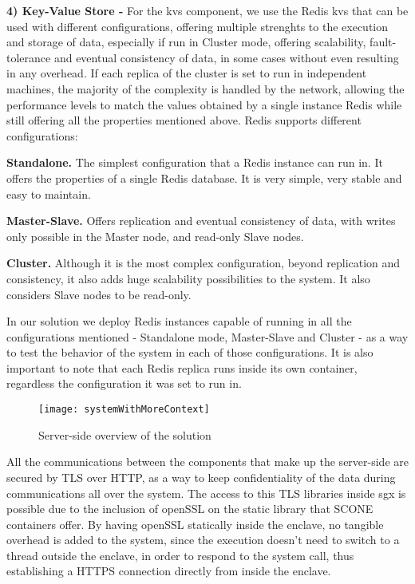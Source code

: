 \vspace{5mm} 

\textbf{4) Key-Value Store -}
For the \gls{kvs} component, we use the Redis \gls{kvs} that can be used with different configurations, offering multiple strenghts to the execution and storage of data, especially if run in Cluster mode, offering scalability, fault-tolerance and eventual consistency of data, in some cases without even resulting in any overhead. 
If each replica of the cluster is set to run in independent machines, the majority of the complexity is handled by the network, allowing the performance levels to match the values obtained by a single instance Redis while still offering all the properties mentioned above. Redis supports different configurations: 

\textbf{Standalone.} The simplest configuration that a Redis instance can run in. It offers the properties of a single Redis database. It is very simple, very stable and easy to maintain.

\textbf{Master-Slave.} Offers replication and eventual consistency of data, with writes only possible in the Master node, and read-only Slave nodes.

\textbf{Cluster.} Although it is the most complex configuration, beyond replication and consistency, it also adds huge scalability possibilities to the system. It also considers Slave nodes to be read-only.

In our solution we deploy Redis instances capable of running in all the configurations mentioned - Standalone mode, Master-Slave and Cluster - as a way to test the behavior of the system in each of those configurations. It is also important to note that each Redis replica runs inside its own container, regardless the configuration it was set to run in. 

\vspace{5mm}

\begin{figure}[htbp]
	\centering
	{\texttt{[image: systemWithMoreContext]}}
	\caption{Server-side overview of the solution}
	\label{fig:serverside_systemModel}
\end{figure}

\vspace{5mm}
All the communications between the components that make up the server-side are secured by TLS over HTTP, as a way to keep confidentiality of the data during communications all over the system. The access to this TLS libraries inside \gls{sgx} is possible due to the inclusion of openSSL on the static library that SCONE containers offer. By having openSSL statically inside the enclave, no tangible overhead is added to the system, since the execution doesn't need to switch to a thread outside the enclave, in order to respond to the system call, thus establishing a HTTPS connection directly from inside the enclave. 

